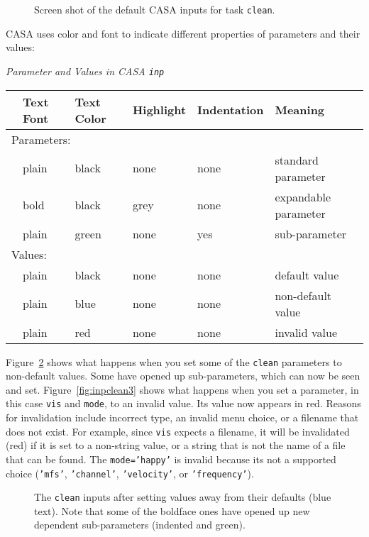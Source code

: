 \begin{figure}[h!]
\begin{center}
\caption{\label{fig:inpclean1} Screen shot of the default CASA inputs
for task {\tt clean}.}
\hrulefill
\end{center}
\end{figure}

CASA uses color and font to indicate different properties of
parameters and their values:
\begin{center}
{\it Parameter and Values in CASA {\tt inp}}\\[5mm]
\begin{tabular}{|l|l|l|l|l|l|}
\hline
  & Text Font & Text Color & Highlight & Indentation & Meaning \\
\hline
\multicolumn{6}{|l|}{Parameters:}\\
\hline
  & plain & black & none & none & standard parameter \\
  & bold  & black & grey & none & expandable parameter \\
  & plain & green & none & yes & sub-parameter \\
\hline
\multicolumn{6}{|l|}{Values:}\\
\hline
  & plain & black & none & none & default value \\
  & plain & blue & none & none & non-default value \\
  & plain & red & none & none & invalid value \\
\hline
\end{tabular}
\end{center}

Figure~\ref{fig:inpclean2} shows what happens when you set some of the
{\tt clean} parameters to non-default values.  Some have
opened up sub-parameters, which can now be seen and set.
Figure~\ref{fig:inpclean3} shows what happens when you set a
parameter, in this case {\tt vis} and {\tt mode}, to an invalid value.  
Its value now appears in red.  Reasons for invalidation include
incorrect type, an invalid menu choice, or a filename that does not
exist.  For example, since {\tt vis} expects a
filename, it will be invalidated (red) if it is set to a non-string
value, or a string that is not the name of a file that can be found.
The {\tt mode='happy'} is invalid because its not a supported choice
({\tt'mfs'}, {\tt'channel'}, {\tt'velocity'}, or {\tt'frequency'}).

\begin{figure}[h]
\begin{center}
\caption{\label{fig:inpclean2} The {\tt clean} inputs after
setting values away from their defaults (blue text).
Note that some of the boldface ones have opened up new 
dependent sub-parameters (indented and green).
}
\hrulefill
\end{center}
\end{figure}

